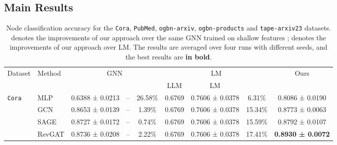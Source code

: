 \documentclass{article}
\begin{document}
\subsection{Main Results}

\begin{table}[!ht]
\caption{Node classification accuracy for the \texttt{Cora}, \texttt{PubMed}, \texttt{ogbn-arxiv}, \texttt{ogbn-products} and \texttt{tape-arxiv23} datasets.  denotes the improvements of our approach over the same GNN trained on shallow features ;  denotes the improvements of our approach over LM. The results are averaged over four runs with different seeds, and the best results are \textbf{in bold}.}
\tiny
    \label{tab: performance}
    \centering
\begin{tabular}{llccccccc}
\toprule
    \multirow{2}{*}{Dataset}     
    & \multirow{2}{*}{Method}
    & \multicolumn{3}{c}{GNN} 
    & \multicolumn{3}{c}{LM}
    & \multicolumn{1}{c}{Ours}\\
    \cmidrule(lr){3-5}\cmidrule(lr){6-8}\cmidrule(lr){9-9}
    &  
    &
    & 
    & 
    & LLM 
    & LM 
    &  
    &  
    \\
    \midrule
         \multirow{3}{*}{\texttt{Cora}} 
         & {MLP}
         & {0.6388 ± 0.0213}
         & {--}
         & 26.58\%
         & {0.6769}
         & {0.7606 ± 0.0378}
         & 6.31\%
         & 0.8086 ± 0.0190
         \\
         & GCN 
         & 0.8653 ± 0.0139
         & --
         & 1.39\%
         & 0.6769
         & 0.7606 ± 0.0378
         & 15.34\%
         & 0.8773 ± 0.0063
         \\
         & SAGE
         & 0.8727 ± 0.0172
         & --
         & 0.74\%
         & 0.6769
         & 0.7606 ± 0.0378
         & 15.59\%
         & 0.8792 ± 0.0107\\
         & RevGAT
         & 0.8736 ± 0.0208
         & --
         & 2.22\%
         & 0.6769
         & 0.7606 ± 0.0378
         & 17.41\%
         & \textbf{0.8930 ± 0.0072}
         

\end{tabular}
\end{table}
\end{document}
